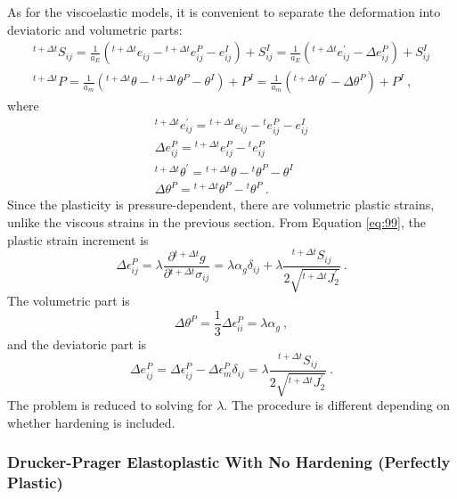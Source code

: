 As for the viscoelastic models, it is convenient to separate the deformation
into deviatoric and volumetric parts:
\begin{gather}
^{t+\Delta t}S_{ij}=\frac{1}{a_{E}}\left(^{t+\Delta t}e_{ij}-\phantom{}^{t+\Delta t}e_{ij}^{P}-e_{ij}^{I}\right)+S_{ij}^{I}=\frac{1}{a_{E}}\left(^{t+\Delta t}e_{ij}^{\prime}-\Delta e_{ij}^{P}\right)+S_{ij}^{I}\label{eq:105}\\
^{t+\Delta t}P=\frac{1}{a_{m}}\left(^{t+\Delta t}\theta-\phantom{}^{t+\Delta t}\theta^{P}-\theta^{I}\right)+P^{I}=\frac{1}{a_{m}}\left(^{t+\Delta t}\theta^{\prime}-\Delta\theta^{P}\right)+P^{I}\:,\nonumber 
\end{gather}
where
\begin{gather}
^{t+\Delta t}e_{ij}^{\prime}=\phantom{}^{t+\Delta t}e_{ij}-\phantom{}^{t}e_{ij}^{P}-e_{ij}^{I}\nonumber \\
\Delta e_{ij}^{P}=\phantom{}^{t+\Delta t}e_{ij}^{P}-\phantom{}^{t}e_{ij}^{P}\nonumber \\
^{t+\Delta t}\theta^{\prime}=\phantom{}^{t+\Delta t}\theta-\phantom{}^{t}\theta^{P}-\theta^{I}\nonumber \\
\Delta\theta^{P}=\phantom{}^{t+\Delta t}\theta^{P}-\phantom{}^{t}\theta^{P}\:.\label{eq:106}
\end{gather}
Since the plasticity is pressure-dependent, there are volumetric plastic
strains, unlike the viscous strains in the previous section. From
Equation \vref{eq:99}, the plastic strain increment is
\begin{equation}
\Delta\epsilon_{ij}^{P}=\lambda\frac{\partial\phantom{}^{t+\Delta t}g}{\partial\phantom{}^{t+\Delta t}\sigma_{ij}}=\lambda\alpha_{g}\delta_{ij}+\lambda\frac{^{t+\Delta t}S_{ij}}{2\sqrt{^{t+\Delta t}J_{2}^{\prime}}}\:.\label{eq:107}
\end{equation}
The volumetric part is
\begin{equation}
\Delta\theta^{P}=\frac{1}{3}\Delta\epsilon_{ii}^{P}=\lambda\alpha_{g}\:,\label{eq:108}
\end{equation}
and the deviatoric part is
\begin{equation}
\Delta e_{ij}^{P}=\Delta\epsilon_{ij}^{P}-\Delta\epsilon_{m}^{P}\delta_{ij}=\lambda\frac{^{t+\Delta t}S_{ij}}{2\sqrt{^{t+\Delta t}J_{2}^{\prime}}}\:.\label{eq:109}
\end{equation}
The problem is reduced to solving for $\lambda$. The procedure is
different depending on whether hardening is included.


\subsubsection{Drucker-Prager Elastoplastic With No Hardening (Perfectly Plastic)}

